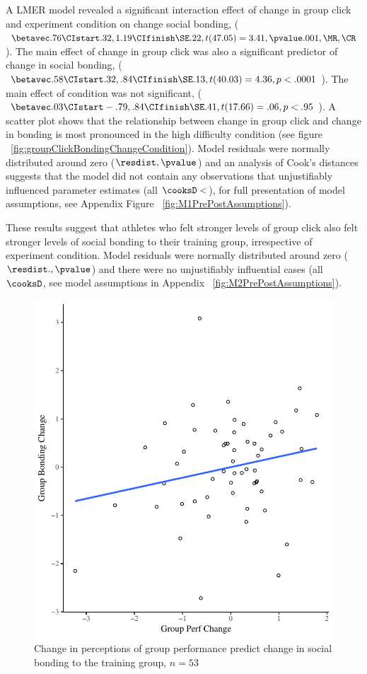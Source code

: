 A LMER model revealed a significant interaction effect of change in group click and experiment condition on change social bonding, ($\betavec .76 \CIstart .32, 1.19 \CIfinish \SE.22, t(47.05) = 3.41, \pvalue .001, \MR , \CR $).  The main effect of change in group click was also a significant predictor of change in social bonding, ($\betavec .58 \CIstart .32, .84 \CIfinish \SE.13, t(40.03) = 4.36, p < .0001 $).  The main effect of condition was not significant, ($\betavec .03 \CIstart -.79, .84 \CIfinish \SE.41, t(17.66) = .06, p < .95 $).  A scatter plot shows that the relationship between change in group click and change in bonding is most pronounced in the high difficulty condition (see figure ~\ref{fig:groupClickBondingChangeCondition}). Model residuals were normally distributed around zero ($\resdist , \pvalue $) and an analysis of Cook's distances suggests that the model did not contain any observations that unjustifiably influenced parameter estimates (all $\cooksD < $), for full presentation of model assumptions, see Appendix Figure ~\ref{fig:M1PrePostAssumptions}).

These results suggest that athletes who felt stronger levels of group click also felt stronger levels of social bonding to their training group, irrespective of experiment condition.  Model residuals were normally distributed around zero ($\resdist ., \pvalue $) and there were no unjustifiably influential cases (all $\cooksD $, see model assumptions in Appendix ~\ref{fig:M2PrePostAssumptions}).






\begin{figure}
  \centering
  \includegraphics[width=0.5\linewidth,keepaspectratio] {images/groupPerfBondingChangeCondition}
  \caption{Change in perceptions of group performance predict change in social bonding to the training group, $n = 53$}
 \label{fig:groupPerfBondingChangeCondition}
\end{figure}

